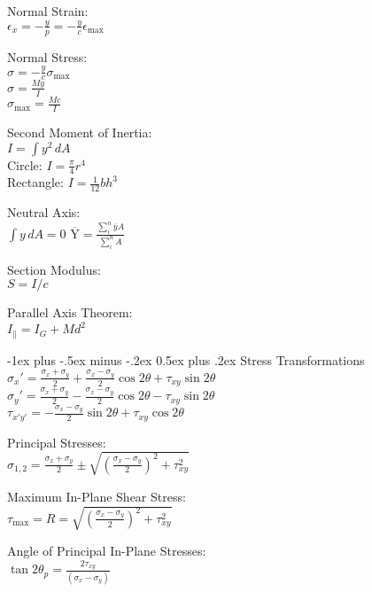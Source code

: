 \documentclass[10pt,landscape]{article}
\makeatletter
\renewcommand{\section}{\@startsection{section}{1}{0mm}%
                                {-1ex plus -.5ex minus -.2ex}%
                                {0.5ex plus .2ex}%
                                {\normalfont\large\bfseries}}
\newcommand{\tab}{\hspace{.02\textwidth}}
\newcommand{\ds}{\displaystyle}
\makeatother
\begin{document}
\begin{multicols}{3}
Normal Strain:\\
\vspace{1mm}
\tab $\ds \epsilon_{x} = -\frac{y}{p} = -\frac{y}{c}\epsilon_{\text{max}}$

Normal Stress:\\
\vspace{1mm}
\tab $\ds \sigma = -\frac{y}{c}\sigma_{\text{max}}$\\
\vspace{1mm}
\tab $\ds \sigma = \frac{My}{I}$\\
\vspace{1mm}
\tab $\ds \sigma_{\text{max}} = \frac{Mc}{I}$

Second Moment of Inertia:\\
\tab $I = \int y^2\,dA$\\
\tab Circle: $\ds I = \frac{\pi}{4}r^4$\\
\tab Rectangle: $\ds I = \frac{1}{12}bh^3$

Neutral Axis:\\
\tab $\int y\,dA = 0$
\tab $\overline{\text{Y}}=\frac{\sum_i^n\overline{y}A}{\sum_i^nA}$

Section Modulus:\\
\tab $S = I/c$

Parallel Axis Theorem:\\
\tab $I_{\parallel} = I_G + Md^2$

\section{Stress Transformations}
\tab $\ds \sigma_x' = \frac{\sigma_x + \sigma_y}{2}	+ \frac{\sigma_x - \sigma_y}{2}\cos2\theta + \tau_{xy}\sin2\theta$
\\[2mm]
\tab $\ds \sigma_y' = \frac{\sigma_x + \sigma_y}{2}	- \frac{\sigma_x - \sigma_y}{2}\cos2\theta - \tau_{xy}\sin2\theta$
\\[2mm]
\tab $\ds \tau_{x'y'} = -\frac{\sigma_x - \sigma_y}{2}\sin2\theta + \tau_{xy}\cos2\theta$

Principal Stresses:\\
\tab $\ds \sigma_{1,2} = \frac{\sigma_x + \sigma _y}{2} \pm \sqrt{\left(\frac{\sigma_x - \sigma_y}{2}\right)^2 + \tau_{xy}^2}$

Maximum In-Plane Shear Stress:\\
\vspace{1mm}
\tab $\ds \tau_{\text{max}} = R = \sqrt{\left(\frac{\sigma_x - \sigma_y}{2}\right)^2 + \tau_{xy}^2}$

Angle of Principal In-Plane Stresses:\\
\tab $\ds \tan 2\theta_p = \frac{2\tau_{xy}}{(\sigma_x - \sigma_y)}$


\end{multicols}
\end{document}
